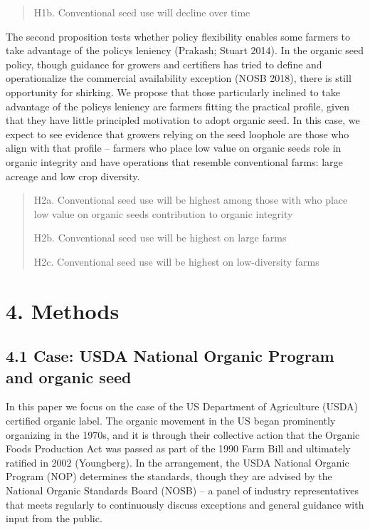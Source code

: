 \documentclass[twoside,12pt,final]{ucthesis-CA2012}
\begin{document}
\begin{ucmainmatter}
\begin{quote}
H1b. Conventional seed use will decline over time
\end{quote}
The second proposition tests whether policy flexibility enables some
farmers to take advantage of the policy\textquotesingle s leniency (Prakash; Stuart
2014). In the organic seed policy, though guidance for growers and
certifiers has tried to define and operationalize the \textquotesingle commercial
availability\textquotesingle{} exception (NOSB 2018), there is still opportunity for
shirking. We propose that those particularly inclined to take advantage
of the policy\textquotesingle s leniency are farmers fitting the \textquotesingle practical\textquotesingle{} profile,
given that they have little principled motivation to adopt organic seed.
In this case, we expect to see evidence that growers relying on the seed
loophole are those who align with that profile -- farmers who place low
value on organic seeds\textquotesingle{} role in organic integrity and have operations
that resemble conventional farms: large acreage and low crop diversity.
\begin{quote}
H2a. Conventional seed use will be highest among those with who place
low value on organic seeds\textquotesingle{} contribution to organic integrity

H2b. Conventional seed use will be highest on large farms

H2c. Conventional seed use will be highest on low-diversity farms
\end{quote}
\hypertarget{methods}{%
\section{4. Methods}\label{methods}}

\hypertarget{case-usda-national-organic-program-and-organic-seed}{%
\subsection{4.1 Case: USDA National Organic Program and organic seed}\label{case-usda-national-organic-program-and-organic-seed}}

In this paper we focus on the case of the US Department of Agriculture
(USDA) certified organic label. The organic movement in the US began
prominently organizing in the 1970s, and it is through their collective
action that the Organic Foods Production Act was passed as part of the
1990 Farm Bill and ultimately ratified in 2002 (Youngberg). In the
arrangement, the USDA National Organic Program (NOP) determines the
standards, though they are advised by the National Organic Standards
Board (NOSB) -- a panel of industry representatives that meets regularly
to continuously discuss exceptions and general guidance with input from
the public.


\end{ucmainmatter}
\end{document}
